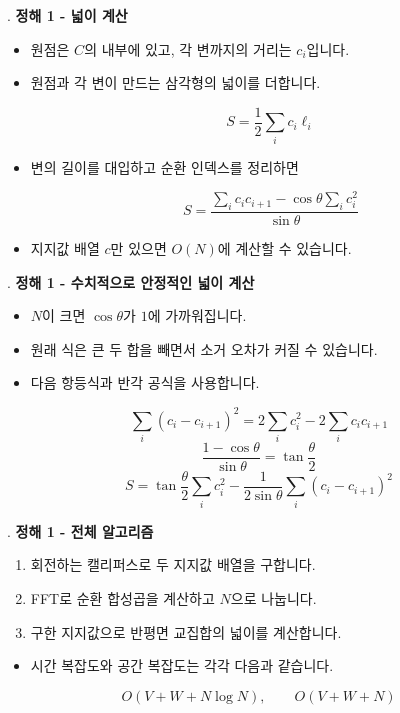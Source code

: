 \begin{frame}{\textbf{\pletter}. \ptitle}
    \textbf{정해 1 - 넓이 계산}
    \begin{itemize}
        \setlength{\abovedisplayskip}{5pt}
        \setlength{\belowdisplayskip}{5pt}
        \item 원점은 $C$의 내부에 있고, 각 변까지의 거리는 $c_i$입니다.
        \item 원점과 각 변이 만드는 삼각형의 넓이를 더합니다.
    
    \[
        S=\frac12\sum_i c_i\ell_i
    \]
    
        \item 변의 길이를 대입하고 순환 인덱스를 정리하면
    
    \[
        \boxed{
            S=\frac{
                \displaystyle\sum_i c_ic_{i+1}
                -\cos\theta\displaystyle\sum_i c_i^2
            }{\sin\theta}
        }
    \]
    
        \item 지지값 배열 $c$만 있으면 $O(N)$에 계산할 수 있습니다.
    \end{itemize}
\end{frame}

\begin{frame}{\textbf{\pletter}. \ptitle}
    \textbf{정해 1 - 수치적으로 안정적인 넓이 계산}
    \begin{itemize}
        \setlength{\abovedisplayskip}{5pt}
        \setlength{\belowdisplayskip}{5pt}
        \item $N$이 크면 $\cos\theta$가 $1$에 가까워집니다.
        \item 원래 식은 큰 두 합을 빼면서 소거 오차가 커질 수 있습니다.
        \item 다음 항등식과 반각 공식을 사용합니다.
    \end{itemize}
    \[
        \sum_i(c_i-c_{i+1})^2
        =2\sum_i c_i^2-2\sum_i c_ic_{i+1}
    \]
    \[
        \frac{1-\cos\theta}{\sin\theta}=\tan\frac\theta2
    \]
    \[
        \boxed{
            S=\tan\frac\theta2\sum_i c_i^2
            -\frac1{2\sin\theta}\sum_i(c_i-c_{i+1})^2
        }
    \]
\end{frame}

\begin{frame}{\textbf{\pletter}. \ptitle}
    \textbf{정해 1 - 전체 알고리즘}
    \begin{enumerate}
        \item 회전하는 캘리퍼스로 두 지지값 배열을 구합니다.
        \item FFT로 순환 합성곱을 계산하고 $N$으로 나눕니다.
        \item 구한 지지값으로 반평면 교집합의 넓이를 계산합니다.
    \end{enumerate}
    \begin{itemize}
        \item 시간 복잡도와 공간 복잡도는 각각 다음과 같습니다.
    \end{itemize}
    \[
        \boxed{O(V+W+N\log N)},\qquad
        \boxed{O(V+W+N)}
    \]
\end{frame}

